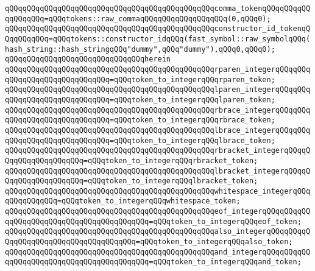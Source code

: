 \verb|qQQqqQQqqQQqqQQqqQQqqQQqqQQqqQQqqQQqqQQqqQQqqQQqcomma_tokenqQQqqQQqqQQqqQQqqQQq=qQQqtokens::raw_commaqQQqqQQqqQQqqQQqqQQq(0,qQQq0);|\newline
\newline
\verb|qQQqqQQqqQQqqQQqqQQqqQQqqQQqqQQqqQQqqQQqqQQqqQQqconstructor_id_tokenqQQqqQQqqQQq=qQQqtokens::constructor_idqQQq(fast_symbol::raw_symbolqQQq(hash_string::hash_stringqQQq"dummy",qQQq"dummy"),qQQq0,qQQq0);|\newline
\newline
\verb|qQQqqQQqqQQqqQQqqQQqqQQqqQQqqQQqherein|\newline
\newline
\verb|qQQqqQQqqQQqqQQqqQQqqQQqqQQqqQQqqQQqqQQqqQQqqQQqrparen_integerqQQqqQQqqQQqqQQqqQQqqQQqqQQqqQQq=qQQqtoken_to_integerqQQqrparen_token;|\newline
\verb|qQQqqQQqqQQqqQQqqQQqqQQqqQQqqQQqqQQqqQQqqQQqqQQqlparen_integerqQQqqQQqqQQqqQQqqQQqqQQqqQQqqQQq=qQQqtoken_to_integerqQQqlparen_token;|\newline
\newline
\verb|qQQqqQQqqQQqqQQqqQQqqQQqqQQqqQQqqQQqqQQqqQQqqQQqrbrace_integerqQQqqQQqqQQqqQQqqQQqqQQqqQQqqQQq=qQQqtoken_to_integerqQQqrbrace_token;|\newline
\verb|qQQqqQQqqQQqqQQqqQQqqQQqqQQqqQQqqQQqqQQqqQQqqQQqlbrace_integerqQQqqQQqqQQqqQQqqQQqqQQqqQQqqQQq=qQQqtoken_to_integerqQQqlbrace_token;|\newline
\newline
\verb|qQQqqQQqqQQqqQQqqQQqqQQqqQQqqQQqqQQqqQQqqQQqqQQqrbracket_integerqQQqqQQqqQQqqQQqqQQqqQQq=qQQqtoken_to_integerqQQqrbracket_token;|\newline
\verb|qQQqqQQqqQQqqQQqqQQqqQQqqQQqqQQqqQQqqQQqqQQqqQQqlbracket_integerqQQqqQQqqQQqqQQqqQQqqQQq=qQQqtoken_to_integerqQQqlbracket_token;|\newline
\newline
\verb|qQQqqQQqqQQqqQQqqQQqqQQqqQQqqQQqqQQqqQQqqQQqqQQqwhitespace_integerqQQqqQQqqQQqqQQq=qQQqtoken_to_integerqQQqwhitespace_token;|\newline
\verb|qQQqqQQqqQQqqQQqqQQqqQQqqQQqqQQqqQQqqQQqqQQqqQQqeof_integerqQQqqQQqqQQqqQQqqQQqqQQqqQQqqQQqqQQqqQQqqQQq=qQQqtoken_to_integerqQQqeof_token;|\newline
\newline
\verb|qQQqqQQqqQQqqQQqqQQqqQQqqQQqqQQqqQQqqQQqqQQqqQQqalso_integerqQQqqQQqqQQqqQQqqQQqqQQqqQQqqQQqqQQqqQQq=qQQqtoken_to_integerqQQqalso_token;|\newline
\verb|qQQqqQQqqQQqqQQqqQQqqQQqqQQqqQQqqQQqqQQqqQQqqQQqand_integerqQQqqQQqqQQqqQQqqQQqqQQqqQQqqQQqqQQqqQQqqQQq=qQQqtoken_to_integerqQQqand_token;|\newline
